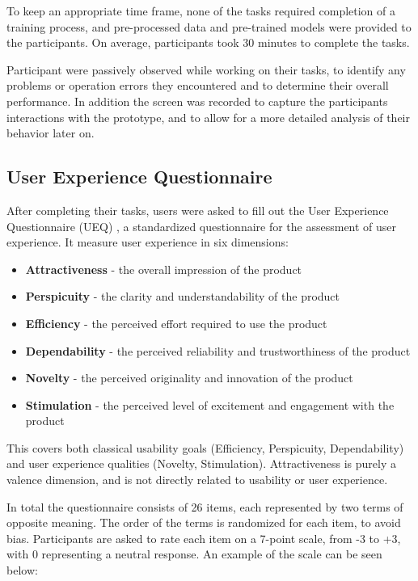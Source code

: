 To keep an appropriate time frame, none of the tasks required completion of a training process, and pre-processed data and pre-trained models were provided to the participants.
On average, participants took 30 minutes to complete the tasks. %

Participant were passively observed while working on their tasks, to identify any problems or operation errors they encountered and to determine their overall performance.
In addition the screen was recorded to capture the participants interactions with the prototype, and to allow for a more detailed analysis of their behavior later on.

\subsection{User Experience Questionnaire}
\label{sec:methodology:study:ueq}

After completing their tasks, users were asked to fill out the User Experience Questionnaire (UEQ) \cite{laugwitz_construction_2008}, a standardized questionnaire for the assessment of user experience.
It measure user experience in six dimensions:

\begin{itemize}
  \item \textbf{Attractiveness} - the overall impression of the product
  \item \textbf{Perspicuity} - the clarity and understandability of the product
  \item \textbf{Efficiency} - the perceived effort required to use the product
  \item \textbf{Dependability} - the perceived reliability and trustworthiness of the product
  \item \textbf{Novelty} - the perceived originality and innovation of the product
  \item \textbf{Stimulation} - the perceived level of excitement and engagement with the product
\end{itemize}

This covers both classical usability goals (Efficiency, Perspicuity, Dependability) and user experience qualities (Novelty, Stimulation).
Attractiveness is purely a valence dimension, and is not directly related to usability or user experience.

In total the questionnaire consists of 26 items, each represented by two terms of opposite meaning. 
The order of the terms is randomized for each item, to avoid bias.
Participants are asked to rate each item on a 7-point scale, from -3 to +3, with 0 representing a neutral response.
An example of the scale can be seen below:

